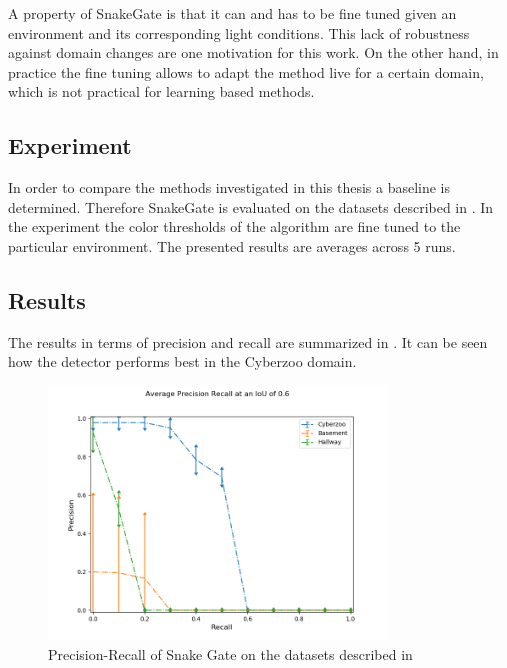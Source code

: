 A property of SnakeGate is that it can and has to be fine tuned given an environment and its corresponding light conditions. This lack of robustness against domain changes are one motivation for this work. On the other hand, in practice the fine tuning allows to adapt the method live for a certain domain, which is not practical for learning based methods.

\subsection{Experiment}

In order to compare the methods investigated in this thesis a baseline is determined. Therefore SnakeGate is evaluated on the datasets described in . In the experiment the color thresholds of the algorithm are fine tuned to the particular environment. The presented results are averages across 5 runs.


\subsection{Results}

The results in terms of precision and recall are summarized in . It can be seen how the detector performs best in the Cyberzoo domain.

\begin{figure}
	\includegraphics[width=0.8\textwidth]{fig/snake_results_real}
	\caption{Precision-Recall of Snake Gate on the datasets described in }
	\label{fig:snake_results_real}
\end{figure}


